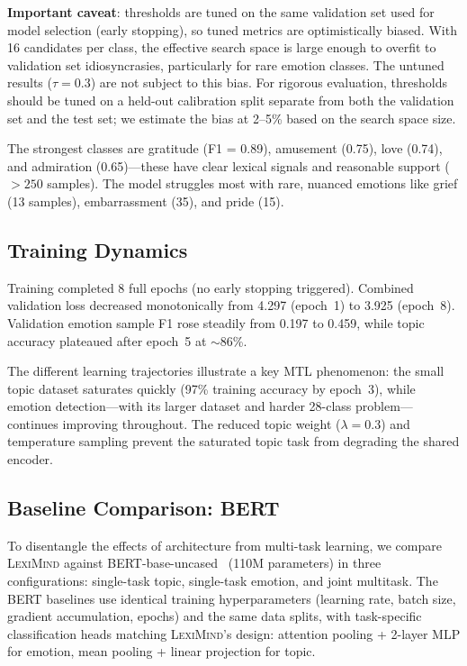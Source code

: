 \documentclass[11pt,a4paper]{article}
\newcommand{\lexiname}{\textsc{LexiMind}}
\begin{document}
\textbf{Important caveat}: thresholds are tuned on the same validation set used for model selection (early stopping), so tuned metrics are optimistically biased.
With 16 candidates per class, the effective search space is large enough to overfit to validation set idiosyncrasies, particularly for rare emotion classes.
The untuned results ($\tau = 0.3$) are not subject to this bias.
For rigorous evaluation, thresholds should be tuned on a held-out calibration split separate from both the validation set and the test set; we estimate the bias at 2--5\% based on the search space size.

The strongest classes are gratitude (F1 = 0.89), amusement (0.75), love (0.74), and admiration (0.65)---these have clear lexical signals and reasonable support ($> 250$ samples).
The model struggles most with rare, nuanced emotions like grief (13 samples), embarrassment (35), and pride (15).

\subsection{Training Dynamics}

Training completed 8 full epochs (no early stopping triggered).
Combined validation loss decreased monotonically from 4.297 (epoch~1) to 3.925 (epoch~8).
Validation emotion sample F1 rose steadily from 0.197 to 0.459, while topic accuracy plateaued after epoch~5 at $\sim$86\%.

The different learning trajectories illustrate a key MTL phenomenon: the small topic dataset saturates quickly (97\% training accuracy by epoch~3), while emotion detection---with its larger dataset and harder 28-class problem---continues improving throughout.
The reduced topic weight ($\lambda = 0.3$) and temperature sampling prevent the saturated topic task from degrading the shared encoder.

\subsection{Baseline Comparison: BERT}

To disentangle the effects of architecture from multi-task learning, we compare \lexiname{} against BERT-base-uncased~\citep{devlin2019bert} (110M parameters) in three configurations: single-task topic, single-task emotion, and joint multitask.
The BERT baselines use identical training hyperparameters (learning rate, batch size, gradient accumulation, epochs) and the same data splits, with task-specific classification heads matching \lexiname{}'s design: attention pooling + 2-layer MLP for emotion, mean pooling + linear projection for topic.
\end{document}
